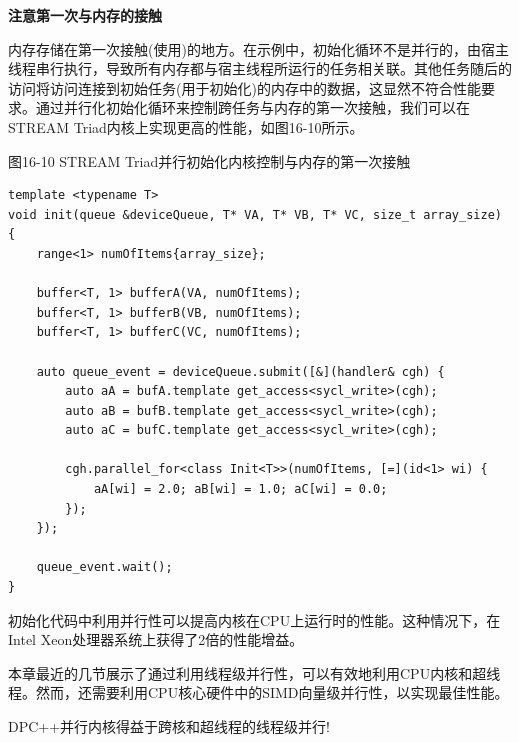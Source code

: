 \hspace*{\fill} \par %
\textbf{注意第一次与内存的接触}

内存存储在第一次接触(使用)的地方。在示例中，初始化循环不是并行的，由宿主线程串行执行，导致所有内存都与宿主线程所运行的任务相关联。其他任务随后的访问将访问连接到初始任务(用于初始化)的内存中的数据，这显然不符合性能要求。通过并行化初始化循环来控制跨任务与内存的第一次接触，我们可以在STREAM Triad内核上实现更高的性能，如图16-10所示。\par

\hspace*{\fill} \par %
图16-10 STREAM Triad并行初始化内核控制与内存的第一次接触
\begin{lstlisting}[caption={}]
template <typename T>
void init(queue &deviceQueue, T* VA, T* VB, T* VC, size_t array_size) {
	range<1> numOfItems{array_size};
	
	buffer<T, 1> bufferA(VA, numOfItems);
	buffer<T, 1> bufferB(VB, numOfItems);
	buffer<T, 1> bufferC(VC, numOfItems);
	
	auto queue_event = deviceQueue.submit([&](handler& cgh) {
		auto aA = bufA.template get_access<sycl_write>(cgh);
		auto aB = bufB.template get_access<sycl_write>(cgh);
		auto aC = bufC.template get_access<sycl_write>(cgh);
		
		cgh.parallel_for<class Init<T>>(numOfItems, [=](id<1> wi) {
			aA[wi] = 2.0; aB[wi] = 1.0; aC[wi] = 0.0;
		});
	});

	queue_event.wait();
}
\end{lstlisting}

初始化代码中利用并行性可以提高内核在CPU上运行时的性能。这种情况下，在Intel Xeon处理器系统上获得了2倍的性能增益。\par

本章最近的几节展示了通过利用线程级并行性，可以有效地利用CPU内核和超线程。然而，还需要利用CPU核心硬件中的SIMD向量级并行性，以实现最佳性能。\par

\begin{tcolorbox}[colback=blue!5!white,colframe=blue!75!black]
DPC++并行内核得益于跨核和超线程的线程级并行!
\end{tcolorbox}





